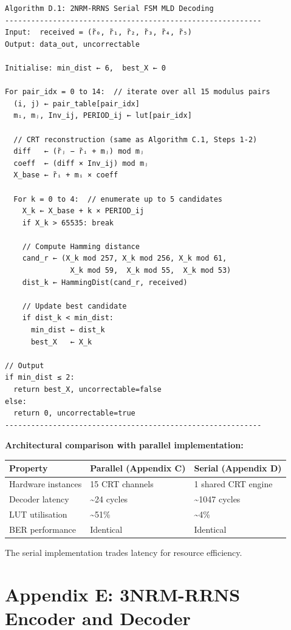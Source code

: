 \documentclass[
  12pt,
  a4paper]{report}
\newcounter{none} %
\begin{document}
\begin{verbatim}
Algorithm D.1: 2NRM-RRNS Serial FSM MLD Decoding
-----------------------------------------------------------
Input:  received = (r̃₀, r̃₁, r̃₂, r̃₃, r̃₄, r̃₅)
Output: data_out, uncorrectable

Initialise: min_dist ← 6,  best_X ← 0

For pair_idx = 0 to 14:  // iterate over all 15 modulus pairs
  (i, j) ← pair_table[pair_idx]
  mᵢ, mⱼ, Inv_ij, PERIOD_ij ← lut[pair_idx]

  // CRT reconstruction (same as Algorithm C.1, Steps 1-2)
  diff   ← (r̃ⱼ − r̃ᵢ + mⱼ) mod mⱼ
  coeff  ← (diff × Inv_ij) mod mⱼ
  X_base ← r̃ᵢ + mᵢ × coeff

  For k = 0 to 4:  // enumerate up to 5 candidates
    X_k ← X_base + k × PERIOD_ij
    if X_k > 65535: break

    // Compute Hamming distance
    cand_r ← (X_k mod 257, X_k mod 256, X_k mod 61,
               X_k mod 59,  X_k mod 55,  X_k mod 53)
    dist_k ← HammingDist(cand_r, received)

    // Update best candidate
    if dist_k < min_dist:
      min_dist ← dist_k
      best_X   ← X_k

// Output
if min_dist ≤ 2:
  return best_X, uncorrectable=false
else:
  return 0, uncorrectable=true
-----------------------------------------------------------
\end{verbatim}

\textbf{Architectural comparison with parallel implementation:}

{\def\LTcaptype{none} %
\begin{longtable}[]{@{}lll@{}}
\toprule\noalign{}
Property & Parallel (Appendix C) & Serial (Appendix D) \\
\midrule\noalign{}
\endhead
\bottomrule\noalign{}
\endlastfoot
Hardware instances & 15 CRT channels & 1 shared CRT engine \\
Decoder latency & \textasciitilde24 cycles & \textasciitilde1047
cycles \\
LUT utilisation & \textasciitilde51\% & \textasciitilde4\% \\
BER performance & Identical & Identical \\
\end{longtable}
}

The serial implementation trades latency for resource efficiency.

\section{Appendix E: 3NRM-RRNS Encoder and
Decoder}\label{appendix-e-3nrm-rrns-encoder-and-decoder}
\end{document}
